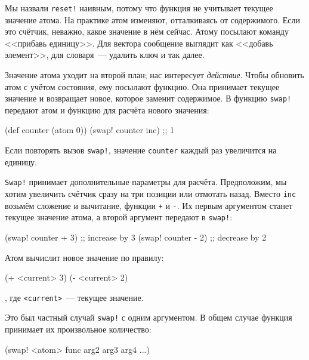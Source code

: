 Мы назвали \verb|reset!| наивным, потому что функция не учитывает текущее
значение атома. На практике атом изменяют, отталкиваясь от содержимого. Если это
счётчик, неважно, какое значение в нём сейчас. Атому посылают команду <<прибавь
единицу>>. Для вектора сообщение выглядит как <<добавь элемент>>, для
словаря~--- удалить ключ и так далее.

Значение атома уходит на второй план; нас интересует \emph{действие}. Чтобы
обновить атом с учётом состояния, ему посылают функцию. Она принимает текущее
значение и возвращает новое, которое заменит содержимое. В функцию
\verb|swap!| передают атом и функцию для расчёта нового значения:


\begin{english}
  \begin{clojure}
(def counter (atom 0))
(swap! counter inc) ;; 1
  \end{clojure}
\end{english}

\noindent
Если повторять вызов \verb|swap!|, значение \verb|counter| каждый раз
увеличится на единицу.

\verb|Swap!| принимает дополнительные параметры для расчёта. Предположим, мы
хотим увеличить счётчик сразу на три позиции или отмотать назад. Вместо
\verb|inc| возьмём сложение и вычитание, функции \verb|+| и \verb|-|. Их
первым аргументом станет текущее значение атома, а второй аргумент передают в
\verb|swap!|:

\begin{english}
  \begin{clojure}
(swap! counter + 3) ;; increase by 3
(swap! counter - 2) ;; decrease by 2
  \end{clojure}
\end{english}

\noindent
Атом вычислит новое значение по правилу:

\begin{english}
  \begin{clojure}
(+ <current> 3)
(- <current> 2)
  \end{clojure}
\end{english}

\noindent
, где \verb|<current>|~--- текущее значение.

Это был частный случай \verb|swap!| с одним аргументом. В общем случае функция
принимает их произвольное количество:

\begin{english}
  \begin{clojure}
(swap! <atom> func arg2 arg3 arg4 ...)
  \end{clojure}
\end{english}

